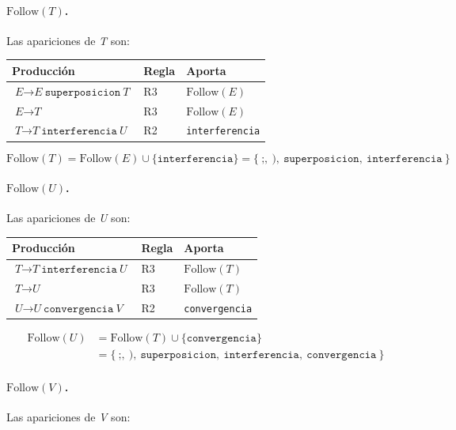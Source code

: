 \documentclass[12pt, letterpaper]{article}
\newcommand{\nt}[1]{\textit{#1}}          %
\newcommand{\tl}[1]{\texttt{#1}}          %
\newcommand{\der}{\ensuremath{\rightarrow}}
\begin{document}
\paragraph{$\mathrm{Follow}(T)$.} Las apariciones de \nt{T} son:

\begin{center}
\begin{tabular}{l l l}
\toprule
Producción & Regla & Aporta \\
\midrule
$\nt{E} \der \nt{E}\ \tl{superposicion}\ \nt{T}$ & R3 & $\mathrm{Follow}(E)$ \\
$\nt{E} \der \nt{T}$ & R3 & $\mathrm{Follow}(E)$ \\
$\nt{T} \der \nt{T}\ \tl{interferencia}\ \nt{U}$ & R2 & \tl{interferencia} \\
\bottomrule
\end{tabular}
\end{center}

\[
  \mathrm{Follow}(T) = \mathrm{Follow}(E) \cup \{\tl{interferencia}\}
  = \{\ \tl{;},\ \tl{)},\ \tl{superposicion},\ \tl{interferencia}\ \}
\]

\paragraph{$\mathrm{Follow}(U)$.} Las apariciones de \nt{U} son:

\begin{center}
\begin{tabular}{l l l}
\toprule
Producción & Regla & Aporta \\
\midrule
$\nt{T} \der \nt{T}\ \tl{interferencia}\ \nt{U}$ & R3 & $\mathrm{Follow}(T)$ \\
$\nt{T} \der \nt{U}$ & R3 & $\mathrm{Follow}(T)$ \\
$\nt{U} \der \nt{U}\ \tl{convergencia}\ \nt{V}$ & R2 & \tl{convergencia} \\
\bottomrule
\end{tabular}
\end{center}

\begin{align*}
  \mathrm{Follow}(U) &= \mathrm{Follow}(T) \cup \{\tl{convergencia}\} \\
  &= \{\ \tl{;},\ \tl{)},\ \tl{superposicion},\ \tl{interferencia},\ \tl{convergencia}\ \}
\end{align*}

\paragraph{$\mathrm{Follow}(V)$.} Las apariciones de \nt{V} son:
\end{document}
